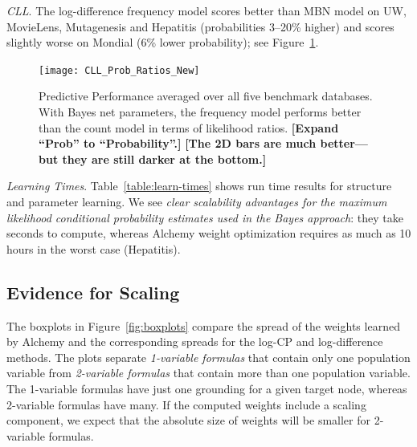 \documentclass[twoside,11pt]{article}
\newcommand{\fixneeded}[1]{\textbf{[\footnotesize #1]}}
\newcommand{\point}[1]{\noindent\emph{#1}.}
\newcommand{\keypoint}[1]{{\em #1}}
\begin{document}
\point{CLL}
The log-difference frequency  model scores better than MBN model on UW, MovieLens, Mutagenesis and Hepatitis (probabilities 3--20\% higher) and scores slightly worse on Mondial (6\% lower probability); see Figure~\ref{fig:summarize}.

\begin{figure}[htbp]

\begin{center}
\texttt{[image: CLL\_Prob\_Ratios\_New]}
\caption{Predictive Performance averaged over all five benchmark databases. With Bayes net parameters, the frequency model performs better than the count model in terms of likelihood ratios. 
\fixneeded{Expand ``Prob'' to ``Probability''.}
\fixneeded{The 2D bars are much better---but they are still darker at the bottom.}
}
\label{fig:summarize}
\end{center}
\end{figure}

\point{Learning Times}
Table~\ref{table:learn-times} shows run time results for structure and parameter learning. We see \keypoint{clear scalability advantages for the maximum likelihood conditional probability estimates used in the Bayes approach}: they take seconds to compute, whereas Alchemy weight optimization requires as much as 10 hours in the worst case (Hepatitis). 




\subsection{Evidence for Scaling} \label{sec:weights}
The boxplots in Figure~\ref{fig:boxplots} compare the spread of the weights learned by Alchemy and the corresponding spreads for the log-CP and log-difference methods.
The plots separate {\em 1-variable formulas} that contain only one population variable %
from {\em 2-variable formulas} that contain more than one population variable.
The 1-variable formulas have just one grounding for a given target node, whereas 2-variable formulas have many. If the computed weights include a scaling component, we expect that the absolute size of weights will be smaller for 2-variable formulas.
\end{document}
